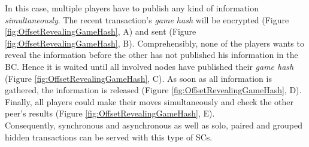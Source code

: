 \begin{figure}
\end{figure}
\noindent In this case, multiple players have to publish any kind of information \textit{simultaneously}.
The recent transaction's \textit{game hash} will be encrypted (Figure \ref{fig:OffsetRevealingGameHash}, A) and sent (Figure \ref{fig:OffsetRevealingGameHash}, B).
Comprehensibly, none of the players wants to reveal the information before the other has not published his information in the \gls{BC}.
Hence it is waited until all involved nodes have published their \textit{game hash} (Figure \ref{fig:OffsetRevealingGameHash}, C).
As soon as all information is gathered, the information is released (Figure \ref{fig:OffsetRevealingGameHash}, D).
Finally, all players could make their moves simultaneously and check the other peer's results (Figure \ref{fig:OffsetRevealingGameHash}, E). \\
Consequently, synchronous and asynchronous as well as solo, paired and grouped hidden transactions can be served with this type of \gls{SC}s. \\

